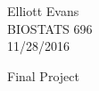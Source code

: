 \documentclass[12pt,letterpaper]{article}
\begin{document}
\begin{flushright}
Elliott Evans\\ BIOSTATS 696\\ 11/28/2016
\end{flushright}

\begin{center}
\LARGE{Final Project}
\end{center}
\begin{flushleft} 





\end{flushleft}
\end{document}
